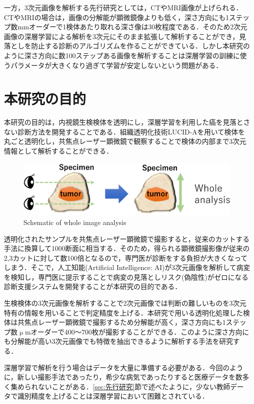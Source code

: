 一方，3次元画像を解析する先行研究としては，CTやMRI画像が上げられる\cite{dou20163d}．CTやMRIの場合は，画像の分解能が顕微鏡像よりも低く，深さ方向にも1ステップ数mmオーダーで1検体あたり取れる深さ像は30枚程度である．そのため2次元画像の深層学習による解析を3次元にそのまま拡張して解析することができ，見落としを防止する診断のアルゴリズムを作ることができている．しかし本研究のように深さ方向に数100ステップある画像を解析することは深層学習の訓練に使うパラメータが大きくなり過ぎて学習が安定しないという問題がある．


\section{本研究の目的}
本研究の目的は，内視鏡生検検体を透明にし，深層学習を利用した癌を見落とさない診断方法を開発することである．組織透明化技術LUCID-Aを用いて検体を丸ごと透明化し，共焦点レーザー顕微鏡で観察することで検体の内部まで3次元情報として解析することができる．

\begin{figure}[H]
	\centering
	\includegraphics[width=0.9\linewidth]{fig/chapter1/whole_image_analysis}
	\caption{Schematic of whole image analysis}
	\label{fig:wholeimageanalysis}
\end{figure}

透明化されたサンプルを共焦点レーザー顕微鏡で撮影すると，従来のカットする手法に換算して1000断面に相当する．そのため，得られる顕微鏡撮影像が従来の2,3カットに対して数100倍となるので，専門医が診断をする負担が大きくなってしまう．そこで，人工知能(Artificial Intelligence: AI)が3次元画像を解析して病変を検知し，専門医に提示することで病変の見落としリスク(偽陰性)がゼロになる診断支援システムを開発することが本研究の目的である．

生検検体の3次元画像を解析することで2次元画像では判断の難しいものを3次元特有の情報を用いることで判定精度を上げる．本研究で用いる透明化処理した検体は共焦点レーザー顕微鏡で撮影するため分解能が高く，深さ方向にも1ステップ数$\upmu$mオーダーで400〜700枚が撮影することができる．このように深さ方向にも分解能が高い3次元画像でも特徴を抽出できるように解析する手法を研究する．

深層学習で解析を行う場合はデータを大量に準備する必要がある．今回のように，新しい撮影手法であったり，希少な病気であったりすると医療データを数多く集められないことがある．\ref{sec:先行研究}節で述べたように，少ない教師データで識別精度を上げることは深層学習において困難とされている．


